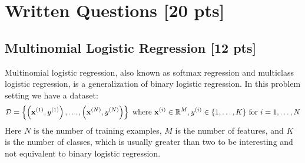 \section{Written Questions [20 pts]}
\label{sec:written}


\subsection{Multinomial Logistic Regression [12 pts]}
Multinomial logistic regression, also known as softmax regression and multiclass logistic regression, is a generalization of binary logistic regression. In this problem setting we have a dataset:
\[
\mathcal{D} = \left\{\left(\mathbf{x}^{(1)}, y^{(1)}\right), \ldots, \left(\mathbf{x}^{(N)}, y^{(N)}\right)\right\} \text{ where } \mathbf{x}^{(i)} \in \mathbb{R}^M, y^{(i)} \in \{1, \ldots, K\} \text{ for } i = 1, \ldots, N
\]
Here $N$ is the number of training examples, $M$ is the number of features, and $K$ is the number of classes, which is usually greater than two to be interesting and not equivalent to binary logistic regression.

